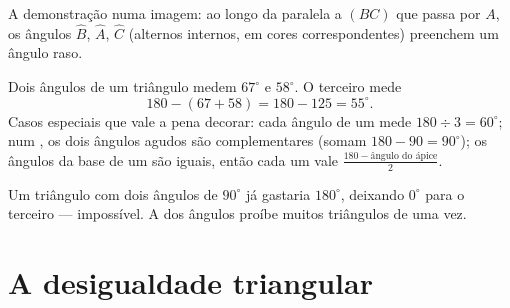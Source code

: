\begin{omfigure}

{\small A demonstração numa imagem: ao longo da paralela a $(BC)$ que
passa por $A$, os ângulos $\widehat B$, $\widehat A$, $\widehat C$
(alternos internos, em cores correspondentes) preenchem um ângulo
raso.}
\end{omfigure}

\begin{example}\label{ex:g7:triangles:sum}
Dois ângulos de um triângulo medem $67^\circ$ e $58^\circ$. O terceiro
mede
\[
180 - (67 + 58) = 180 - 125 = 55^\circ .
\]
Casos especiais que vale a pena decorar: cada ângulo de um  mede $180 \div 3 = 60^\circ$; num , os
dois ângulos agudos são complementares (somam $180 - 90 = 90^\circ$);
os ângulos da base de um  são iguais, então cada um
vale $\frac{180 - \text{ângulo do ápice}}{2}$.
\end{example}

\begin{example}\label{ex:g7:triangles:tworight}
Um triângulo com dois ângulos de $90^\circ$ já gastaria $180^\circ$,
deixando $0^\circ$ para o terceiro --- impossível. A  dos ângulos
proíbe muitos triângulos de uma vez.
\end{example}

\section{A desigualdade triangular}

